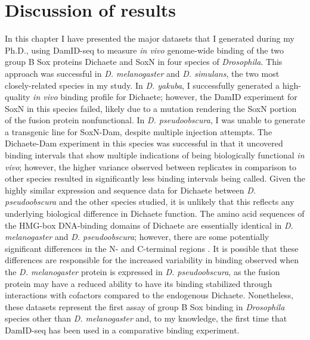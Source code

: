 \section{Discussion of results}
In this chapter I have presented the major datasets that I generated during my Ph.D., using DamID-seq to measure \emph{in vivo} genome-wide binding of the two group B Sox proteins Dichaete and SoxN in four species of \emph{Drosophila}. This approach was successful in \emph{D. melanogaster} and \emph{D. simulans}, the two most closely-related species in my study. In \emph{D. yakuba}, I successfully generated a high-quality \emph{in vivo} binding profile for Dichaete; however, the DamID experiment for SoxN in this species failed, likely due to a mutation rendering the SoxN portion of the fusion protein nonfunctional. In \emph{D. pseudoobscura}, I was unable to generate a transgenic line for SoxN-Dam, despite multiple injection attempts. The Dichaete-Dam experiment in this species was successful in that it uncovered binding intervals that show multiple indications of being biologically functional \emph{in vivo}; however, the higher variance observed between replicates in comparison to other species resulted in significantly less binding intervals being called. Given the highly similar expression and sequence data for Dichaete between \emph{D. pseudoobscura} and the other species studied, it is unlikely that this reflects any underlying biological difference in Dichaete function. The amino acid sequences of the HMG-box DNA-binding domains of Dichaete are essentially identical in \emph{D. melanogaster} and \emph{D. pseudoobscura}; however, there are some potentially significant differences in the N- and C-terminal regions \citep{mckimmie_conserved_2005}. It is possible that these differences are responsible for the increased variability in binding observed when the \emph{D. melanogaster} protein is expressed in \emph{D. pseudoobscura}, as the fusion protein may have a reduced ability to have its binding stabilized through interactions with cofactors compared to the endogenous Dichaete. Nonetheless, these datasets represent the first assay of group B Sox binding in \emph{Drosophila} species other than \emph{D. melanogaster} and, to my knowledge, the first time that DamID-seq has been used in a comparative binding experiment.

